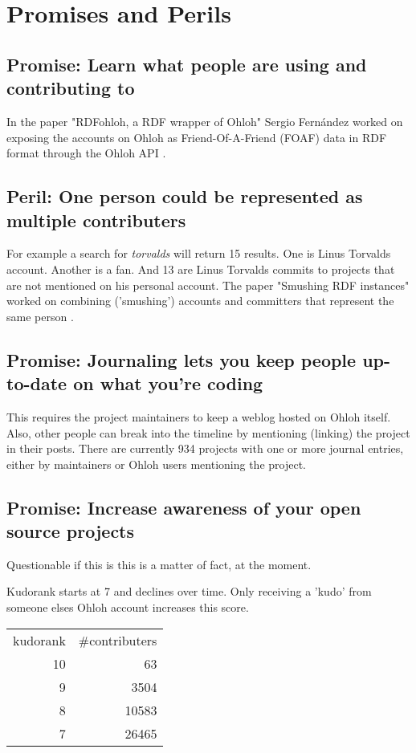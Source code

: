 \documentclass{sig-alternate}
\begin{document}
\section{Promises and Perils}


\subsection{Promise: Learn what people are using and contributing to}
In the paper "RDFohloh, a RDF wrapper of Ohloh" Sergio Fern\'andez worked on exposing the accounts on Ohloh as
Friend-Of-A-Friend (FOAF) data in RDF format through the Ohloh API \cite{Fernandez:2008p4488}.


\subsection{Peril: One person could be represented as multiple contributers}
For example a search for \emph{torvalds} will return 15 results. One is Linus Torvalds account. Another is a fan. And 13 are Linus Torvalds commits to projects that are not mentioned on his personal account.
The paper "Smushing RDF instances" worked on combining ('smushing') accounts and committers that represent the same person \cite{Shi:2009p4464}.


\subsection{Promise: Journaling lets you keep people up-to-date on what you're coding}
This requires the project maintainers to keep a weblog hosted on Ohloh itself. Also, other people can break into the timeline by mentioning (linking) the project in their posts. There are currently 934 projects with one or more journal entries, either by maintainers or Ohloh users mentioning the project.

\subsection{Promise: Increase awareness of your open source projects}
Questionable if this is this is a matter of fact, at the moment. 

Kudorank starts at 7 and declines over time. Only receiving a 'kudo' from someone elses Ohloh account increases this score.

\begin{tabular}{ r r }
  kudorank & \#contributers \\
  10 &    63 \\
  9  &  3504 \\
  8  & 10583 \\
  7  & 26465 \\
\end{tabular}
\end{document}
